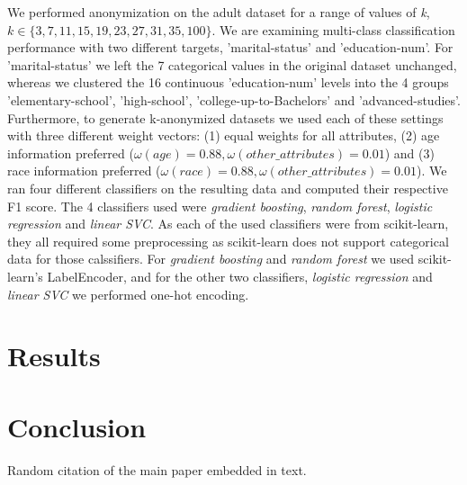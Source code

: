 \documentclass{article}
\begin{document}
We performed anonymization on the adult dataset for a range of values of \textit{k}, ${k \in \{3, 7, 11, 15, 19, 23, 27, 31, 35, 100\}}$. We are examining multi-class classification performance with two different targets, 'marital-status' and 'education-num'. For 'marital-status' we left the 7 categorical values in the original dataset unchanged, whereas we clustered the 16 continuous 'education-num' levels into the 4 groups 'elementary-school', 'high-school', 'college-up-to-Bachelors' and 'advanced-studies'. 
Furthermore, to generate k-anonymized datasets we used each of these settings with three different weight vectors: (1) equal weights for all attributes, (2) age information preferred (${\omega(age)=0.88, \omega(other\_attributes)=0.01}$) and (3) race information preferred (${\omega(race)=0.88, \omega(other\_attributes)=0.01}$).
We ran four different classifiers on the resulting data and computed their respective F1 score. The 4 classifiers used were \textit{gradient boosting}, \textit{random forest}, \textit{logistic regression} and \textit{linear SVC}. As each of the used classifiers were from scikit-learn, they all required some preprocessing as scikit-learn does not support categorical data for those calssifiers. For \textit{gradient boosting} and \textit{random forest} we used scikit-learn's LabelEncoder, and for the other two classifiers,  \textit{logistic regression} and \textit{linear SVC} we performed one-hot encoding.
\newpage

\section{Results}
\newpage

\section{Conclusion}

Random citation of the main paper \cite{malle2017not} embedded in text.


\end{document}

